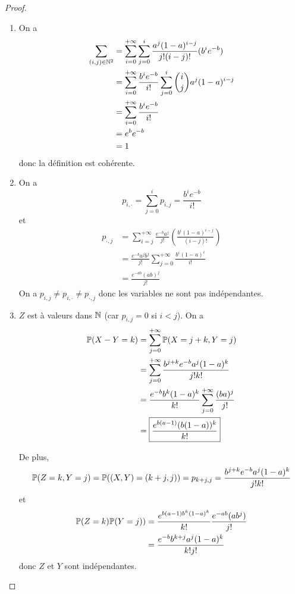 \begin{proof}
    \phantom{}
    \begin{enumerate}
        \item On a 
        \begin{align}
            \sum_{(i,j)\in\N^{2}}
            &=\sum_{i=0}^{+\infty}\sum_{j=0}^{i}\frac{a^{j}(1-a)^{i-j}}{j!(i-j)!}(b^{i}e^{-b})\\
            &=\sum_{i=0}^{+\infty}\frac{b^{i}e^{-b}}{i!}\sum_{j=0}^{i}\binom{i}{j}a^{j}(1-a)^{i-j}\\
            &=\sum_{i=0}^{+\infty}\frac{b^{i}e^{-b}}{i!}\\
            &=e^{b}e^{-b}\\
            &=1
        \end{align}
        donc la définition est cohérente.

        \item On a 
        \begin{equation}
            \boxed{p_{i,\cdot}=\sum_{j=0}^{i}p_{i,j}=\frac{b^{i}e^{-b}}{i!}}
        \end{equation}
        et 
        \begin{align}
            p_{\cdot,j}
            &=\sum_{i=j}^{+\infty}\frac{e^{-b}a^{j}}{j!}\left(\frac{b^{i}(1-a)^{i-j}}{(i-j)!}\right)\\
            &=\frac{e^{-b}a^{j}b^{j}}{j!}\sum_{j=0}^{+\infty}\frac{b^{i}(1-a)^{i}}{i!}\\
            &=\boxed{\frac{e^{-ab}(ab)^{j}}{j!}}
        \end{align}
        On a $p_{i,j}\neq p_{i,\cdot}\neq p_{\cdot,j}$ donc les variables ne sont pas indépendantes.

        \item $Z$ est à valeurs dans $\N$ (car $p_{i,j}=0$ si $i<j$). On a 
        \begin{align}
            \P(X-Y=k)
            &=\sum_{j=0}^{+\infty}\P(X=j+k,Y=j)\\
            &=\sum_{j=0}^{+\infty}\frac{b^{j+k}e^{-b}a^{j}(1-a)^{k}}{j!k!}\\
            &=\frac{e^{-b}b^{k}(1-a)^{k}}{k!}\sum_{j=0}^{+\infty}\frac{(ba)^{j}}{j!}\\
            &=\boxed{\frac{e^{b(a-1)}(b(1-a))^{k}}{k!}}
        \end{align}

        De plus,
        \begin{equation}
            \P(Z=k,Y=j)=\P((X,Y)=(k+j,j))=p_{k+j,j}=\frac{b^{j+k}e^{-b}a^{j}(1-a)^{k}}{j!k!}
        \end{equation}
        et
        \begin{align}
            \P(Z=k)\P(Y=j))
            &=\frac{e^{b(a-1)b^{k}(1-a)^{k}}}{k!}\frac{e^{-ab}(ab^{j})}{j!}\\
            &=\frac{e^{-b}b^{k+j}a^{j}(1-a)^{k}}{k!j!}
        \end{align}
        donc $Z$ et $Y$ sont indépendantes.
    \end{enumerate}
\end{proof}

